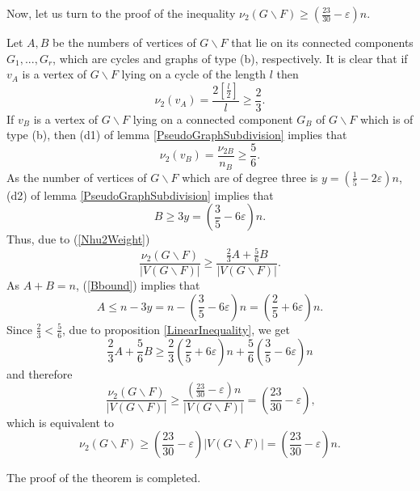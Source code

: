 \documentclass[fleqn,12pt,twoside]{article}
\newenvironment{proof}[1][Proof.]{\begin{trivlist}
\item[\hskip \labelsep {\bfseries #1}]}{\end{trivlist}}
\begin{document}
\begin{proof}
Now, let us turn to the proof of the inequality $\nu
_{2}(G\backslash F)\geq (\frac{23}{30}-\varepsilon )n$.

Let $A,B$ be the numbers of vertices of $G\backslash F$ that lie on
its connected components $G_{1},...,G_{r}$, which are cycles and
graphs of type (b), respectively. It is clear that if $v_{A}$ is a
vertex of $G\backslash F$ lying on a cycle of the length $l$ then
\begin{equation*}
\nu _{2}(v_{A})=\frac{2\left[ \frac{l}{2}\right] }{l}\geq
\frac{2}{3}\text{.}
\end{equation*}If $v_{B}$ is a vertex of $G\backslash F$ lying on a connected component $G_{B}$ of $G\backslash F$ which is of type (b), then (d1) of lemma \ref {PseudoGraphSubdivision} implies that
\begin{equation*}
\nu _{2}(v_{B})=\frac{\nu _{2B}}{n_B}\geq \frac{5}{6}.
\end{equation*}As the number of vertices of $G\backslash F$ which are of degree three is $y=(\frac{1}{5}-2\varepsilon )n $, (d2) of lemma \ref {PseudoGraphSubdivision} implies that
\begin{equation}
B\geq 3y=(\frac{3}{5}-6\varepsilon )n. \label{Bbound}
\end{equation}Thus, due to (\ref{Nhu2Weight})\begin{equation*}
\frac{\nu _{2}(G\backslash F)}{\left\vert V(G\backslash
F)\right\vert }\geq
\frac{\frac{2}{3}A+\frac{5}{6}B}{\left\vert V(G\backslash F)\right\vert }\text{.}
\end{equation*}As $A+B=n$, (\ref{Bbound}) implies that
\begin{equation*}
A\leq n -3y=n -(\frac{3}{5}-6\varepsilon )n =(\frac{2}{5}+6\varepsilon )n.
\end{equation*}Since $\frac{2}{3}<\frac{5}{6}$, due to proposition
\ref{LinearInequality}, we get
\begin{equation*}
\frac{2}{3}A+\frac{5}{6}B\geq \frac{2}{3}(\frac{2}{5}+6\varepsilon
)n +\frac{5}{6}(\frac{3}{5}-6\varepsilon )n
\end{equation*}and therefore\begin{equation*}
\frac{\nu _{2}(G\backslash F)}{\left\vert V(G\backslash
F)\right\vert }\geq \frac{(\frac{23}{30}-\varepsilon )n}{\left\vert
V(G\backslash F)\right\vert }=(\frac{23}{30}-\varepsilon )\text{,}
\end{equation*}which is equivalent to\begin{equation*}
\nu _{2}(G\backslash F)\geq (\frac{23}{30}-\varepsilon )\left\vert
V(G\backslash F)\right\vert =(\frac{23}{30}-\varepsilon )n.
\end{equation*}

The proof of the theorem is completed.
\end{proof}
\end{document}
